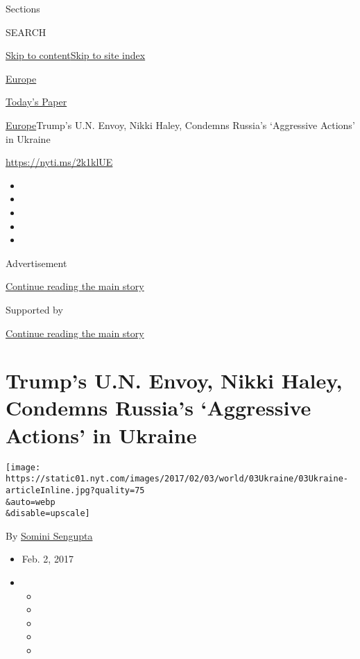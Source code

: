 Sections

SEARCH

\protect\hyperlink{site-content}{Skip to
content}\protect\hyperlink{site-index}{Skip to site index}

\href{https://www.nytimes.com/section/world/europe}{Europe}

\href{https://myaccount.nytimes.com/auth/login?response_type=cookie\&client_id=vi}{}

\href{https://www.nytimes.com/section/todayspaper}{Today's Paper}

\href{/section/world/europe}{Europe}\textbar{}Trump's U.N. Envoy, Nikki
Haley, Condemns Russia's `Aggressive Actions' in Ukraine

\url{https://nyti.ms/2k1klUE}

\begin{itemize}
\item
\item
\item
\item
\item
\end{itemize}

Advertisement

\protect\hyperlink{after-top}{Continue reading the main story}

Supported by

\protect\hyperlink{after-sponsor}{Continue reading the main story}

\hypertarget{trumps-un-envoy-nikki-haley-condemns-russias-aggressive-actions-in-ukraine}{%
\section{Trump's U.N. Envoy, Nikki Haley, Condemns Russia's `Aggressive
Actions' in
Ukraine}\label{trumps-un-envoy-nikki-haley-condemns-russias-aggressive-actions-in-ukraine}}

\texttt{[image: https://static01.nyt.com/images/2017/02/03/world/03Ukraine/03Ukraine-articleInline.jpg?quality=75\\\&auto=webp\\\&disable=upscale]}

By \href{http://www.nytimes.com/by/somini-sengupta}{Somini Sengupta}

\begin{itemize}
\item
  Feb. 2, 2017
\item
  \begin{itemize}
  \item
  \item
  \item
  \item
  \item
  \end{itemize}
\end{itemize}

